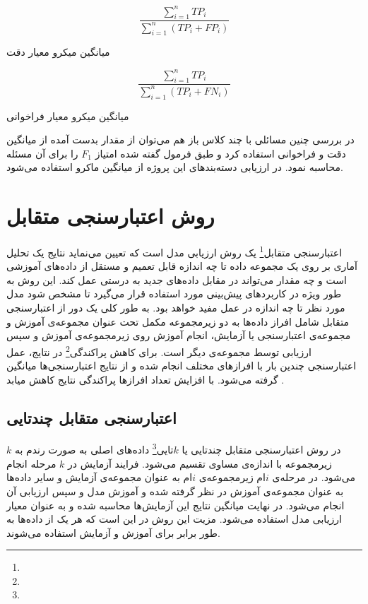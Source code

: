 \begin{center}
	\begin{minipage}[b]{.45\textwidth}
		\begin{equation}
		\label{eqn:pp}
		\frac{\sum_{i = 1}^{n} TP_i}{\sum_{i = 1}^{n} (TP_i + FP_i)}
		\end{equation}
		\centerline{\small{میانگین میکرو معیار دقت}}
	\end{minipage}
	\quad
	\begin{minipage}[b]{.45\textwidth}
		\begin{equation}
		\label{eqn:f12_score}
		\frac{\sum_{i = 1}^{n} TP_i}{\sum_{i = 1}^{n} (TP_i + FN_i)}
		\end{equation}
		\centerline{\small{میانگین میکرو معیار فراخوانی}}
	\end{minipage}
\end{center}
در بررسی چنین مسائلی با چند کلاس باز هم می‌توان از مقدار بدست آمده از میانگین دقت و فراخوانی استفاده کرد و طبق فرمول گفته شده امتیاز $F_1$ را برای آن مسئله محاسبه نمود. در ارزیابی دسته‌بندهای این پروژه از میانگین ماکرو استفاده می‌شود.
\section{روش اعتبارسنجی متقابل}
اعتبارسنجی متقابل\footnote{} یک روش ارزیابی مدل است که تعیین می‌نماید نتایج یک تحلیل آماری بر روی یک مجموعه ‌داده تا چه اندازه قابل تعمیم و مستقل از داده‌های آموزشی است و چه مقدار می‌تواند در مقابل داده‌های جدید به درستی عمل کند. این روش به ‌طور ویژه در کاربردهای پیش‌بینی مورد استفاده قرار می‌گیرد تا مشخص شود مدل مورد نظر تا چه اندازه در عمل مفید خواهد بود. به ‌طور کلی یک دور از اعتبارسنجی متقابل شامل افراز داده‌ها به دو زیرمجموعه مکمل تحت عنوان مجموعه‌ی آموزش و مجموعه‌ی اعتبارسنجی یا آزمایش، انجام آموزش روی زیرمجموعه‌ی آموزش و سپس ارزیابی توسط مجموعه‌ی دیگر است. برای کاهش پراکندگی\footnote{} در نتایج، عمل اعتبارسنجی چندین بار با افرازهای مختلف انجام شده و از نتایج اعتبارسنجی‌ها میانگین گرفته می‌شود. با افزایش تعداد افرازها پراکندگی نتایج کاهش میابد \cite{seni2010ensemble}.

\subsection{اعتبارسنجی متقابل چندتایی}
در روش اعتبارسنجی متقابل چندتایی یا $k$تایی\footnote{} داده‌های اصلی به صورت رندم به $k$ زیرمجموعه با اندازه‌ی مساوی تقسیم می‌شود. فرایند آزمایش در $k$ مرحله انجام می‌شود. در مرحله‌ی $i$ام زیرمجموعه‌ی $i$ام به عنوان مجموعه‌ی آزمایش و سایر داده‌ها به عنوان مجموعه‌ی آموزش در نظر گرفته شده و آموزش مدل و سپس ارزیابی آن انجام می‌شود. در نهایت میانگین نتایج این آزمایش‌ها محاسبه شده و به عنوان معیار ارزیابی مدل استفاده می‌شود.
مزیت این روش در این است که هر یک از داده‌ها به طور برابر برای آموزش و آزمایش استفاده می‌شوند.
